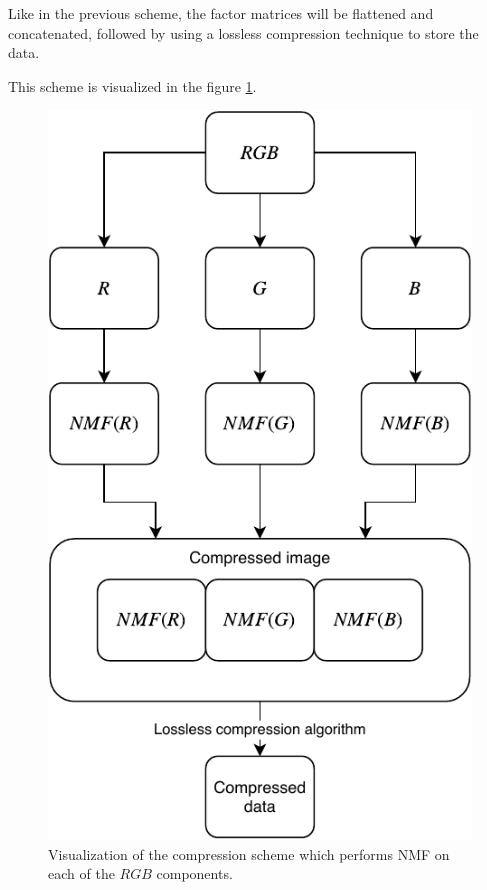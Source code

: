 \documentclass[thesis=M,english]{FITthesis}[2012/10/20]
\begin{document}
Like in the previous scheme, the factor matrices will be flattened and concatenated,
followed by using a lossless compression technique to store the data.

This scheme is visualized in the figure \ref{fig:nmf-rgbseparate-scheme}.

\begin{figure}[h]
  \centering
  \includegraphics{imgs/comprseparatergb}
  \caption[Visualization of the separate RGB compression scheme]{Visualization of the compression scheme which performs NMF on each of the
  $RGB$ components.}
  \label{fig:nmf-rgbseparate-scheme}
\end{figure}
\end{document}
